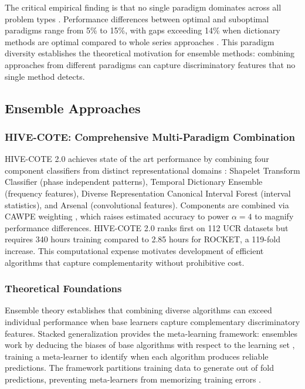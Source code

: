 \documentclass[pdflatex,sn-basic]{sn-jnl}           %
\theoremstyle{thmstyleone}%
\theoremstyle{thmstyletwo}%
\theoremstyle{thmstylethree}%
\begin{document}
The critical empirical finding is that no single paradigm dominates across all problem types \citep[Table~11, p.~648]{tsc-bakeoff}. Performance differences between optimal and suboptimal paradigms range from 5\% to 15\%, with gaps exceeding 14\% when dictionary methods are optimal compared to whole series approaches \citep[Table~11, p.~648]{tsc-bakeoff}. This paradigm diversity establishes the theoretical motivation for ensemble methods: combining approaches from different paradigms can capture discriminatory features that no single method detects.

\subsection{Ensemble Approaches}

\subsubsection{HIVE-COTE: Comprehensive Multi-Paradigm Combination}

HIVE-COTE 2.0 achieves state of the art performance by combining four component classifiers from distinct representational domains \citep[p.~3]{hive-cote-2}: Shapelet Transform Classifier (phase independent patterns), Temporal Dictionary Ensemble (frequency features), Diverse Representation Canonical Interval Forest (interval statistics), and Arsenal (convolutional features). Components are combined via CAWPE weighting \citep{cawpe}, which raises estimated accuracy to power $\alpha=4$ to magnify performance differences. HIVE-COTE 2.0 ranks first on 112 UCR datasets but requires 340 hours training compared to 2.85 hours for ROCKET, a 119-fold increase. This computational expense motivates development of efficient algorithms that capture complementarity without prohibitive cost.

\subsubsection{Theoretical Foundations}

Ensemble theory establishes that combining diverse algorithms can exceed individual performance when base learners capture complementary discriminatory features. Stacked generalization \citep{stacked-generalization} provides the meta-learning framework: ensembles work by deducing the biases of base algorithms with respect to the learning set \citep[p.~241]{stacked-generalization}, training a meta-learner to identify when each algorithm produces reliable predictions. The framework partitions training data to generate out of fold predictions, preventing meta-learners from memorizing training errors \citep[p.~244]{stacked-generalization}.
\end{document}
